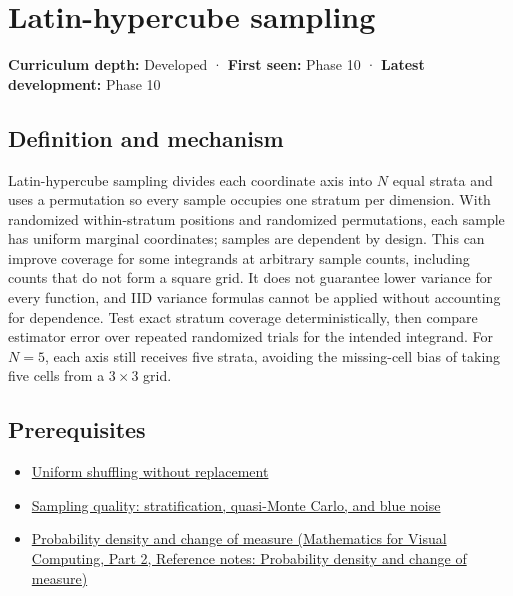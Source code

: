 \hypertarget{appendix-1c5e85693a06}{}\label{referencestart:appendix-1c5e85693a06}
\section{Latin-hypercube sampling}\label{appendix-1c5e85693a06-latin-hypercube-sampling}

\hypertarget{appendix-1c5e85693a06-latin-hypercube-sampling}{}

\textbf{Curriculum depth:} Developed · \textbf{First seen:} Phase 10 · \textbf{Latest development:} Phase 10

\begin{allmightroledefinition}

\subsection{Definition and mechanism}\label{appendix-1c5e85693a06-definition-and-mechanism}

\hypertarget{appendix-1c5e85693a06-definition-and-mechanism}{}

Latin-hypercube sampling divides each coordinate axis into \(N\) equal strata and uses a permutation so every sample occupies one stratum per dimension. With randomized within-stratum positions and randomized permutations, each sample has uniform marginal coordinates; samples are dependent by design. This can improve coverage for some integrands at arbitrary sample counts, including counts that do not form a square grid. It does not guarantee lower variance for every function, and IID variance formulas cannot be applied without accounting for dependence. Test exact stratum coverage deterministically, then compare estimator error over repeated randomized trials for the intended integrand. For \(N=5\), each axis still receives five strata, avoiding the missing-cell bias of taking five cells from a \(3\times3\) grid.

\end{allmightroledefinition}

\subsection{Prerequisites}\label{appendix-1c5e85693a06-prerequisites}

\hypertarget{appendix-1c5e85693a06-prerequisites}{}

\begin{itemize}
\tightlist
\item
  \hyperref[appendix-184fcc411663]{Uniform shuffling without replacement}
\item
  \hyperref[appendix-9f693ffd82bc]{Sampling quality: stratification, quasi-Monte Carlo, and blue noise}
\item
  \href{../02-Mathematics-for-Visual-Computing-P02/main.pdf\#appendix-4815cd87ab8b}{Probability density and change of measure (Mathematics for Visual Computing, Part 2, Reference notes: Probability density and change of measure)}
\end{itemize}

